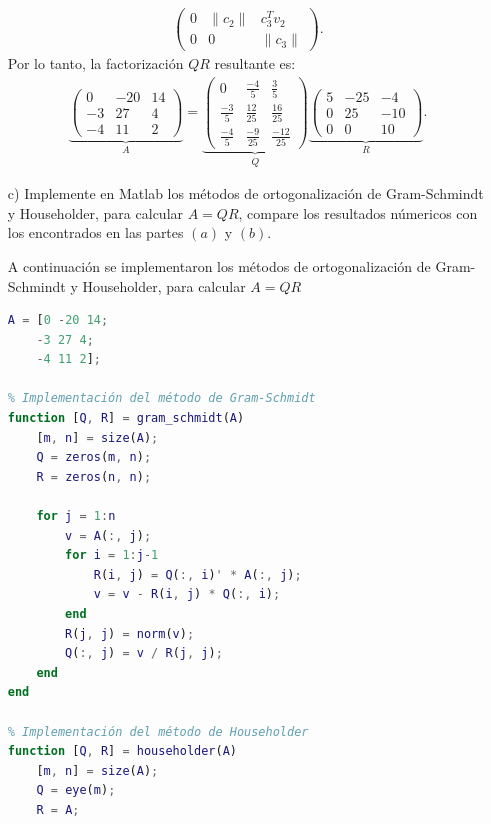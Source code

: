 \begin{homeworkProblem}
\begin{itemize}
\begin{solucion}
\begin{align*}
\begin{pmatrix}
        0 & \|c_2\| & c_3^T v_2 \\
        0 & 0 & \|c_3\|
    \end{pmatrix}.
\end{align*}
Por lo tanto, la factorización $QR$ resultante es:
\begin{align*}
    \underbrace{
    \begin{pmatrix}
        0 & -20 & 14\\
        -3 & 27 & 4\\
        -4 & 11 & 2
    \end{pmatrix}
    }_{A}
    =
    \underbrace{
    \begin{pmatrix}
        0 & \frac{-4}{5} & \frac{3}{5} \\
        \frac{-3}{5} & \frac{12}{25} & \frac{16}{25} \\
        \frac{-4}{5} & \frac{-9}{25} & \frac{-12}{25}
    \end{pmatrix}
    }_{Q}
    \underbrace{
    \begin{pmatrix}
        5 & -25 & -4 \\
        0 & 25 & -10 \\
        0 & 0 & 10
    \end{pmatrix}
    }_{R}.
\end{align*}  
        \end{solucion}
        \item[c)] Implemente en Matlab los métodos de ortogonalización de Gram-Schmindt y Householder, para calcular $A=QR$, compare los resultados númericos con los encontrados en las partes $(a)$ y $(b)$.
        \begin{solucion}
          A continuación se implementaron los métodos de ortogonalización de Gram-Schmindt y Householder, para calcular $A=QR$
          \begin{lstlisting}[language = matlab]
% Definir la matriz A
A = [0 -20 14;
    -3 27 4;
    -4 11 2];

% Implementación del método de Gram-Schmidt
function [Q, R] = gram_schmidt(A)
    [m, n] = size(A);
    Q = zeros(m, n);
    R = zeros(n, n);

    for j = 1:n
        v = A(:, j);
        for i = 1:j-1
            R(i, j) = Q(:, i)' * A(:, j);
            v = v - R(i, j) * Q(:, i);
        end
        R(j, j) = norm(v);
        Q(:, j) = v / R(j, j);
    end
end

% Implementación del método de Householder
function [Q, R] = householder(A)
    [m, n] = size(A);
    Q = eye(m);
    R = A;


\end{lstlisting}
\end{solucion}
\end{itemize}
\end{homeworkProblem}
